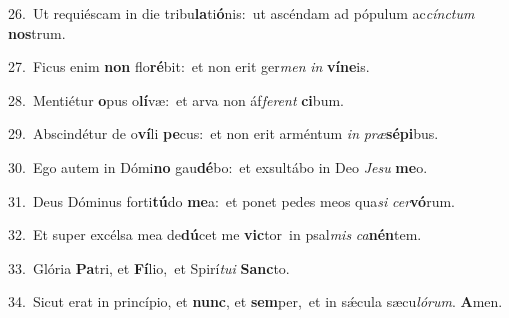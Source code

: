 {\numbfont\textcolor{\numbcolor}{26.}}~Ut requiéscam in die tribu\-\textbf{la}\-ti\-\textbf{ó}\-nis:~\star ut ascéndam ad pópulum ac\-\textit{cínc}\-\textit{tum} \textbf{nos}\-trum.\par
{\numbfont\textcolor{\numbcolor}{27.}}~Ficus enim \textbf{non} flo\-\textbf{ré}\-bit:~\star et non erit ger\textit{men} \textit{in} \textbf{ví}\-\textbf{ne}is.\par
{\numbfont\textcolor{\numbcolor}{28.}}~Mentiétur \textbf{o}\-pus o\-\textbf{lí}\-væ:~\star et arva non áf\-\textit{fe}\-\textit{rent} \textbf{ci}\-bum.\par
{\numbfont\textcolor{\numbcolor}{29.}}~Abscindétur de o\-\textbf{ví}\-li \textbf{pe}\-cus:~\star et non erit arméntum \textit{in} \textit{præ}\-\textbf{sé}\textbf{pi}bus.\par
{\numbfont\textcolor{\numbcolor}{30.}}~Ego autem in Dómi\textbf{no} gau\-\textbf{dé}\-bo:~\star et exsultábo in Deo \textit{Je}\-\textit{su} \textbf{me}\-o.\par
{\numbfont\textcolor{\numbcolor}{31.}}~Deus Dóminus forti\-\textbf{tú}\-do \textbf{me}\-a:~\star et ponet pedes meos qua\textit{si} \textit{cer}\-\textbf{vó}rum.\par
{\numbfont\textcolor{\numbcolor}{32.}}~Et super excélsa mea de\-\textbf{dú}\-cet me \textbf{vic}\-tor~\star in psal\textit{mis} \textit{ca}\-\textbf{nén}tem.\par
{\numbfont\textcolor{\numbcolor}{33.}}~Glória \textbf{Pa}\-tri, et \textbf{Fí}\-lio,~\star et Spirí\-\textit{tu}\-\textit{i} \textbf{Sanc}\-to.\par
{\numbfont\textcolor{\numbcolor}{34.}}~Sicut erat in princípio, et \textbf{nunc}\-, et \textbf{sem}\-per,~\star et in sǽcula sæcu\-\textit{ló}\-\textit{rum}. \textbf{A}\-men.\par
